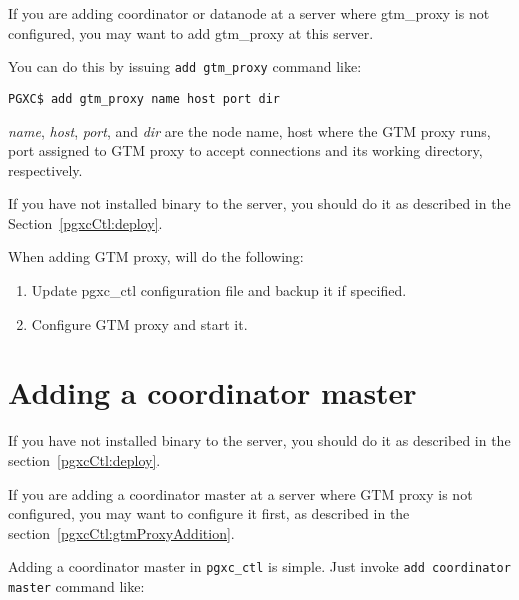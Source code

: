   If you are adding coordinator or datanode at a server where gtm\_proxy is not configured,
  you may want to add gtm\_proxy at this server.
  
  You can do this by issuing \texttt{add gtm\_proxy} command like:
  
  \vspace{\parskip}
  \begin{lstlisting}[basicstyle=\ttfamily\normalsize,frame=single]
PGXC$ add gtm_proxy name host port dir
  \end{lstlisting}
  
  {\it name}, {\it host}, {\it port}, and {\it dir} are the node name, host where the GTM
  proxy runs, port assigned to GTM proxy to accept connections and its working directory,
  respectively.
  
  If you have not installed \XC{} binary to the server, you should do it as described in the
  Section~\ref{pgxcCtl:deploy}.
  
  When adding GTM proxy,  will do the following:
  
  \begin{enumerate}
	  \item Update pgxc\_ctl configuration file and backup it if specified.
	  \item Configure GTM proxy and start it. 
  \end{enumerate}



\section{\label{pgxcCtl:addCoordMaster}Adding a coordinator master}

  If you have not installed \XC{} binary to the server, you should do it as described in
  the section~\ref{pgxcCtl:deploy}.
  
  If you are adding a coordinator master at a server where GTM proxy is not configured,
  you may want to configure it first, as described in the section~\ref{pgxcCtl:gtmProxyAddition}.
  
  Adding a coordinator master in \verb|pgxc_ctl| is simple.
  Just invoke \verb|add coordinator master| command like:
  
